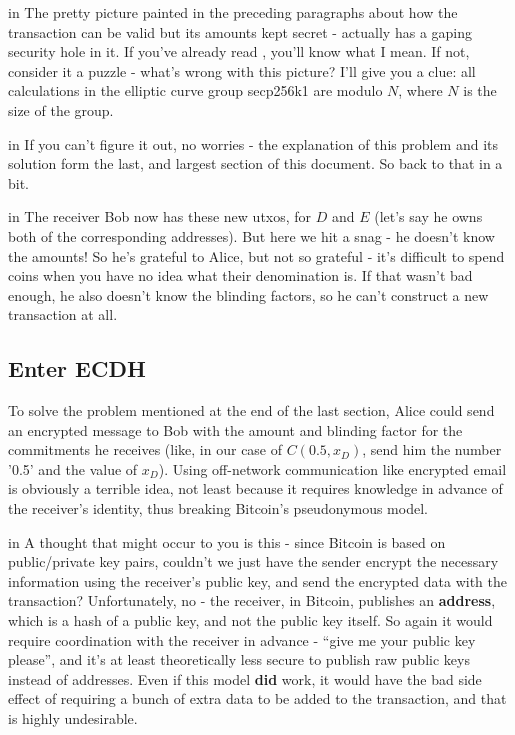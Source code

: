 \documentclass[10pt,a4paper]{article}
\begin{document}
 in \noindent The pretty picture painted in the preceding paragraphs about how the transaction can be valid but its amounts kept secret - actually has a gaping security hole in it. If you've already read \cite{ct_wu}, you'll know what I mean. If not, consider it a puzzle - what's wrong with this picture? I'll give you a clue: all calculations in the elliptic curve group secp256k1 are modulo $N$, where $N$ is the size of the group.

 in \noindent If you can't figure it out, no worries - the explanation of this problem and its solution form the last, and largest section of this document. So back to that in a bit.

 in \noindent The receiver Bob now has these new utxos, for $D$ and $E$ (let's say he owns both of the corresponding addresses). But here we hit a snag - he doesn't know the amounts! So he's grateful to Alice, but not so grateful - it's difficult to spend coins when you have no idea what their denomination is. If that wasn't bad enough, he also doesn't know the blinding factors, so he can't construct a new transaction at all.

\subsection{Enter ECDH}

To solve the problem mentioned at the end of the last section, Alice could send an encrypted message to Bob with the amount and blinding factor for the commitments he receives (like, in our case of $C(0.5,x_D)$, send him the number '0.5' and the value of $x_D$). Using off-network communication like encrypted email is obviously a terrible idea, not least because it requires knowledge in advance of the receiver's identity, thus breaking Bitcoin's pseudonymous model.

 in \noindent A thought that might occur to you is this - since Bitcoin is based on public/private key pairs, couldn't we just have the sender encrypt the necessary information using the receiver's public key, and send the encrypted data with the transaction? Unfortunately, no - the receiver, in Bitcoin, publishes an \textbf{address}, which is a hash of a public key, and not the public key itself. So again it would require coordination with the receiver in advance - ``give me your public key please'', and it's at least theoretically less secure to publish raw public keys instead of addresses. Even if this model \textbf{did} work, it would have the bad side effect of requiring a bunch of extra data to be added to the transaction, and that is highly undesirable.
\end{document}
